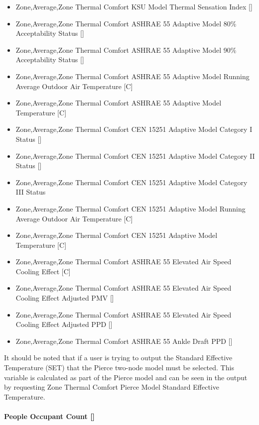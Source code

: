 \begin{itemize}
\item
  Zone,Average,Zone Thermal Comfort KSU Model Thermal Sensation Index {[]}
\item
  Zone,Average,Zone Thermal Comfort ASHRAE 55 Adaptive Model 80\% Acceptability Status {[]}
\item
  Zone,Average,Zone Thermal Comfort ASHRAE 55 Adaptive Model 90\% Acceptability Status {[]}
\item
  Zone,Average,Zone Thermal Comfort ASHRAE 55 Adaptive Model Running Average Outdoor Air Temperature {[}C{]}
\item
  Zone,Average,Zone Thermal Comfort ASHRAE 55 Adaptive Model Temperature {[}C{]}
\item
  Zone,Average,Zone Thermal Comfort CEN 15251 Adaptive Model Category I Status {[]}
\item
  Zone,Average,Zone Thermal Comfort CEN 15251 Adaptive Model Category II Status {[]}
\item
  Zone,Average,Zone Thermal Comfort CEN 15251 Adaptive Model Category III Status
\item
  Zone,Average,Zone Thermal Comfort CEN 15251 Adaptive Model Running Average Outdoor Air Temperature {[}C{]}
\item
  Zone,Average,Zone Thermal Comfort CEN 15251 Adaptive Model Temperature {[}C{]}
\item
  Zone,Average,Zone Thermal Comfort ASHRAE 55 Elevated Air Speed Cooling Effect {[}C{]}
\item
  Zone,Average,Zone Thermal Comfort ASHRAE 55 Elevated Air Speed Cooling Effect Adjusted PMV {[]}
\item
  Zone,Average,Zone Thermal Comfort ASHRAE 55 Elevated Air Speed Cooling Effect Adjusted PPD {[]}
\item
  Zone,Average,Zone Thermal Comfort ASHRAE 55 Ankle Draft PPD {[]}
\end{itemize}

It should be noted that if a user is trying to output the Standard Effective Temperature (SET) that the Pierce two-node model must be selected.  This variable is calculated as part of the Pierce model and can be seen in the output by requesting Zone Thermal Comfort Pierce Model Standard Effective Temperature.

\paragraph{People Occupant Count {[]}}\label{people-occupant-count}

